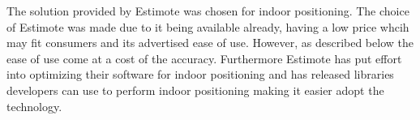 The solution provided by Estimote was chosen for indoor positioning. The choice of Estimote was made due to it being available already, having a low price whcih may fit consumers and its advertised ease of use. However, as described below the ease of use come at a cost of the accuracy.
Furthermore Estimote has put effort into optimizing their software for indoor positioning and has released libraries developers can use to perform indoor positioning making it easier adopt the technology.



